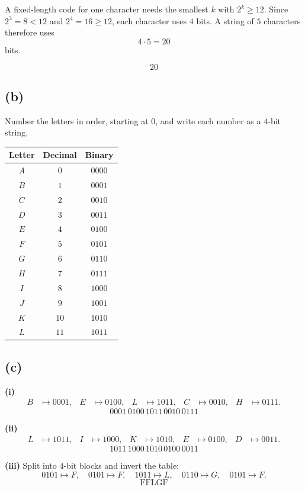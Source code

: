 \documentclass[11pt]{article}
\begin{document}
A fixed-length code for one character needs the smallest $k$ with $2^{k}\ge 12$. Since $2^{3}=8<12$ and $2^{4}=16\ge 12$, each character uses $4$ bits. A string of $5$ characters therefore uses
\[
4\cdot 5=20
\]
bits.

\[
\boxed{20}
\]

\subsection*{(b)}

Number the letters in order, starting at $0$, and write each number as a $4$-bit string.

\begin{center}
\begin{tabular}{ccc}
\toprule
Letter & Decimal & Binary \\
\midrule
$A$ & $0$ & $0000$ \\
$B$ & $1$ & $0001$ \\
$C$ & $2$ & $0010$ \\
$D$ & $3$ & $0011$ \\
$E$ & $4$ & $0100$ \\
$F$ & $5$ & $0101$ \\
$G$ & $6$ & $0110$ \\
$H$ & $7$ & $0111$ \\
$I$ & $8$ & $1000$ \\
$J$ & $9$ & $1001$ \\
$K$ & $10$ & $1010$ \\
$L$ & $11$ & $1011$ \\
\bottomrule
\end{tabular}
\end{center}

\subsection*{(c)}

\textbf{(i)}
\begin{align*}
B&\mapsto 0001, &
E&\mapsto 0100, &
L&\mapsto 1011, &
C&\mapsto 0010, &
H&\mapsto 0111.
\end{align*}
\[
\boxed{0001\,0100\,1011\,0010\,0111}
\]

\textbf{(ii)}
\begin{align*}
L&\mapsto 1011, &
I&\mapsto 1000, &
K&\mapsto 1010, &
E&\mapsto 0100, &
D&\mapsto 0011.
\end{align*}
\[
\boxed{1011\,1000\,1010\,0100\,0011}
\]

\textbf{(iii)}
Split into $4$-bit blocks and invert the table:
\[
0101\mapsto F,\quad
0101\mapsto F,\quad
1011\mapsto L,\quad
0110\mapsto G,\quad
0101\mapsto F.
\]
\[
\boxed{\text{FFLGF}}
\]
\end{document}

